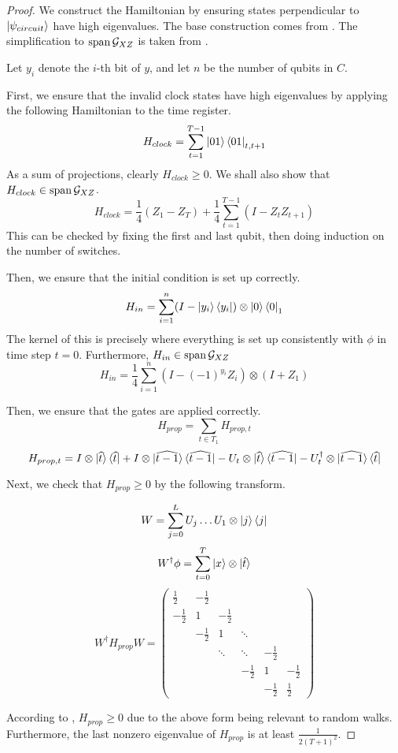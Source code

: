 \begin{proof}
	We construct the Hamiltonian by ensuring states perpendicular to $\ket{\psi_{circuit}}$ have high eigenvalues. The base construction comes from \cite{kitaev2002classical}. The simplification to $\operatorname*{\operatorname{span}}\mathcal{G}_{XZ}$ is taken from \cite{PhysRevA.78.012352}.

Let $y_i$ denote the $i$-th bit of $y$, and let $n$ be the number of qubits in $C$.

First, we ensure that the invalid clock states have high eigenvalues by applying the following Hamiltonian to the time register.
$$H_{clock}=\sum_{t=1}^{T-1}\ket{01}\bra{01}_{t,t+1}$$
As a sum of projections, clearly $H_{clock}\geq 0$. We shall also show that $H_{clock}\in\operatorname*{\operatorname{span}}\mathcal{G}_{XZ}$.
$$H_{clock}=\frac{1}{4}(Z_1 - Z_T) + \frac{1}{4}\sum_{t=1}^{T-1}(I-Z_tZ_{t+1}) $$
This can be checked by fixing the first and last qubit, then doing induction on the number of switches.

Then, we ensure that the initial condition is set up correctly.
$$H_{in}=\sum_{i=1}^n(I-\ket{y_i}\bra{y_i})\otimes\ket{0}\bra{0}_1$$
The kernel of this is precisely where everything is set up consistently with $\phi$ in time step $t=0$. Furthermore, $H_{in}\in\operatorname*{\operatorname{span}}\mathcal{G}_{XZ}$
$$H_{in}=\frac{1}{4}\sum_{i=1}^n(I-(-1)^{y_i}Z_i)\otimes(I+Z_1)$$

Then, we ensure that the gates are applied correctly.
$$H_{prop}=\sum_{t\in T_1}H_{prop,t}$$
$$H_{prop,t}=I\otimes\ket{\widehat{t}}\bra{\widehat{t}}
	+I\otimes\ket{\widehat{t-1}}\bra{\widehat{t-1}}
	-U_t\otimes\ket{\widehat{t}}\bra{\widehat{t-1}}
	-U_t^\dagger\otimes\ket{\widehat{t-1}}\bra{\widehat{t}}$$

Next, we check that $H_{prop}\geq0$ by the following transform.

$$W=\sum_{j=0}^L U_j\ldots U_1\otimes\ket{j}\bra{j}$$
$$W^\dagger\phi=\sum_{t=0}^T\ket{x}\otimes\ket{\hat{t}}$$
$$W^\dagger H_{prop} W=
\begin{pmatrix}
	\frac{1}{2} & -\frac{1}{2} & & & &  \\
	-\frac{1}{2} & 1 & -\frac{1}{2} & & & \\
	& -\frac{1}{2} & 1 & \ddots & & \\
	& & \ddots & \ddots & -\frac{1}{2} & \\
	& & & -\frac{1}{2} & 1 & -\frac{1}{2} \\
	& & & & -\frac{1}{2} & \frac{1}{2}
\end{pmatrix}$$

According to \cite{2002quant.ph.10077A}, $H_{prop}\geq 0$ due to the above form being relevant to random walks. Furthermore, the last nonzero eigenvalue of $H_{prop}$ is at least $\frac{1}{2(T+1)^2}$.


\end{proof}

